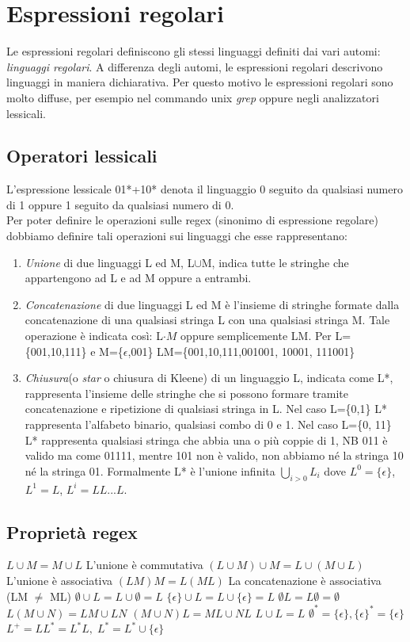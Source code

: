 \documentclass[12pt]{article}
\begin{document}
	\section{Espressioni regolari}
	Le espressioni regolari definiscono gli stessi linguaggi definiti dai vari automi: \emph{linguaggi regolari}. A differenza degli automi, le espressioni regolari descrivono linguaggi in maniera dichiarativa. Per questo motivo le espressioni regolari sono molto diffuse, per esempio nel commando unix \emph{grep} oppure negli analizzatori lessicali.

	\subsection{Operatori lessicali}
	L'espressione lessicale 01*+10* denota il linguaggio 0 seguito da qualsiasi numero di 1 oppure 1 seguito da qualsiasi numero di 0.
	\\ Per poter definire le operazioni sulle regex (sinonimo di espressione regolare) dobbiamo definire tali operazioni sui linguaggi che esse rappresentano:
	\begin{enumerate}
		\item \emph{Unione} di due linguaggi L ed M, L$\cup$M, indica tutte le stringhe che appartengono ad L e ad M oppure a entrambi.
		\item \emph{Concatenazione} di due linguaggi L ed M è l'insieme di stringhe formate dalla concatenazione di una qualsiasi stringa L con una qualsiasi stringa M. Tale operazione è indicata così: L$\cdot M$ oppure semplicemente LM.
		      Per L=\{001,10,111\} e M=\{$\epsilon$,001\}
		      LM=\{001,10,111,001001, 10001, 111001\}
		\item \emph{Chiusura}(o \emph{star} o chiusura di Kleene) di un linguaggio L, indicata come L*, rappresenta l'insieme delle stringhe che si possono formare tramite concatenazione e ripetizione di qualsiasi stringa in L. Nel caso L=\{0,1\} L* rappresenta l'alfabeto binario, qualsiasi combo di 0 e 1. Nel caso L=\{0, 11\} L* rappresenta qualsiasi stringa che abbia una o più coppie di 1, NB 011 è valido ma come 01111, mentre 101 non è valido, non abbiamo né la stringa 10 né la stringa 01. Formalmente L* è l'unione infinita $\bigcup_{i>0}L_i$ dove $L^0=\{\epsilon\}$, $L^1=L$, $L^i=LL...L$.
	\end{enumerate}

	\newpage
	\subsection{Proprietà regex}
	\begin{outline}
		\1 $L\cup M=M\cup L$ L'unione è commutativa
		\1 $(L\cup M) \cup M= L\cup (M\cup L)$ L'unione è associativa
		\1 $(LM) M= L (M L)$ La concatenazione è associativa (LM $\neq$ ML)
		\1 $\emptyset \cup L= L \cup \emptyset=L$
		\1 $\{\epsilon\} \cup L= L \cup \{\epsilon\}=L$
		\1 $\emptyset L= L \emptyset=\emptyset$
		\1 $L(M\cup N)= LM \cup LN$
		\1 $(M\cup N)L=ML\cup NL$
		\1 $L\cup L=L$
		\1 $\emptyset^*=\{\epsilon\}, \{\epsilon\}^* =\{\epsilon\}$
		\1 $L^+=LL^*=L^*L,\;L^*=L^*\cup \{\epsilon\}$
	\end{outline}
\end{document}
